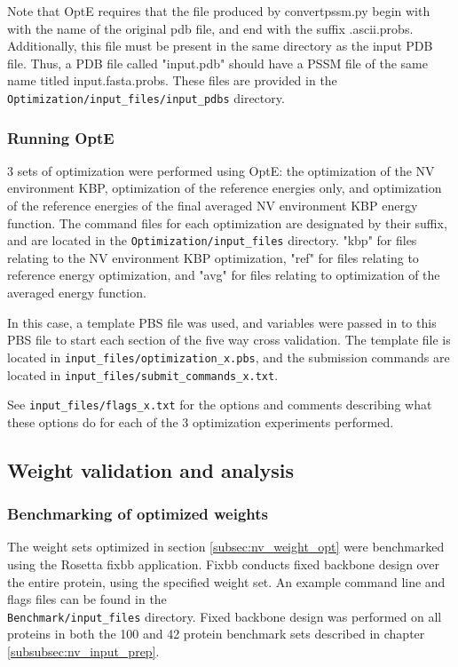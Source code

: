 Note that OptE requires that the file produced by convertpssm.py begin with with the name of the original pdb file, and end with the suffix .ascii.probs.
Additionally, this file must be present in the same directory as the input \ac{PDB} file.
Thus, a \ac{PDB} file called "input.pdb" should have a \ac{PSSM} file of the same name titled input.fasta.probs.
These files are provided in the \texttt{Optimization/input\_files/input\_pdbs} directory.

\subsubsection{Running OptE}
3 sets of optimization were performed using OptE: the optimization of the \ac{NV} environment \ac{KBP}, optimization of the reference energies only, and optimization of the reference energies of the final averaged \ac{NV} environment \ac{KBP} energy function.
The command files for each optimization are designated by their suffix, and are located in the \texttt{Optimization/input\_files} directory.
"kbp" for files relating to the \ac{NV} environment \ac{KBP} optimization, "ref" for files relating to reference energy optimization, and "avg" for files relating to optimization of the averaged energy function.  

In this case, a template \ac{PBS} file was used, and variables were passed in to this \ac{PBS} file to start each section of the five way cross validation.
The template file is located in \texttt{input\_files/optimization\_x.pbs}, and the submission commands are located in \texttt{input\_files/submit\_commands\_x.txt}.

See \texttt{input\_files/flags\_x.txt} for the options and comments describing what these options do for each of the 3 optimization experiments performed. 

\subsection{Weight validation and analysis}

\subsubsection{Benchmarking of optimized weights}

The weight sets optimized in section \ref{subsec:nv_weight_opt} were benchmarked using the Rosetta fixbb application.
Fixbb conducts fixed backbone design over the entire protein, using the specified weight set. 
An example command line and flags files can be found in the\\
\texttt{Benchmark/input\_files} directory.
Fixed backbone design was performed on all proteins in both the 100 and 42 protein benchmark sets described in chapter \ref{subsubsec:nv_input_prep}.


